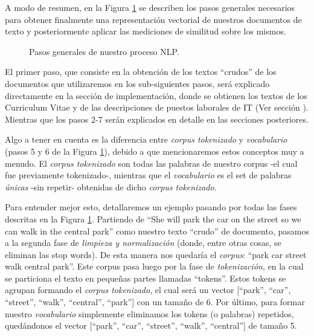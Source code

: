 \documentclass[12pt,a4paper]{article}
\begin{document}
\begin{sloppypar}
A modo de resumen, en la Figura \ref{fig:Imagen_NLP_1} se describen los pasos generales necesarios para obtener finalmente una representación vectorial de nuestros documentos de texto y posteriormente aplicar las mediciones de similitud sobre los mismos.

\begin{figure}[H]    %
 \centering
 \noindent{}
 \caption{Pasos generales de nuestro proceso NLP.}
 \label{fig:Imagen_NLP_1}
\end{figure}

\cleardoublepage

El primer paso, que consiste en la obtención de los textos “crudos” de los documentos que utilizaremos en los sub-siguientes pasos, será explicado directamente en la sección de implementación, donde se obtienen los textos de los Curriculum Vitae y de las descripciones de puestos laborales de IT (Ver sección \textit{}). Mientras que los pasos 2-7 serán explicados en detalle en las secciones posteriores. 

Algo a tener en cuenta es la diferencia entre \textit{corpus tokenizado} y \textit{vocabulario} (pasos 5 y 6 de la Figura \ref{fig:Imagen_NLP_1}), debido a que mencionaremos estos conceptos muy a menudo. El \textit{corpus tokenizado} son todas las palabras de nuestro corpus -el cual fue previamente tokenizado-, mientras que el \textit{vocabulario} es el set de palabras \textit{únicas} -sin repetir- obtenidas de dicho \textit{corpus tokenizado}.

Para entender mejor esto, detallaremos un ejemplo pasando por todas las fases descritas en la Figura  \ref{fig:Imagen_NLP_1}. Partiendo de “She will park the car on the street so we can walk in the central park” como nuestro texto “crudo” de documento, pasamos a la segunda fase de \textit{limpieza y normalización} (donde, entre otras cosas, se eliminan las stop words). De esta manera nos quedaría el \textit{corpus}: “park car street walk central park”. Este corpus pasa luego por la fase de \textit{tokenización}, en la cual se particiona el texto en pequeñas partes llamadas “tokens”. Estos tokens se agrupan formando el \textit{corpus tokenizado}, el cual será un vector [“park”, “car”, “street”, “walk”, “central”, “park”] con un tamaño de 6. Por último, para formar nuestro \textit{vocabulario} simplemente eliminamos los tokens (o palabras) repetidos, quedándonos el vector [“park”, “car”, “street”, “walk”, “central”] de tamaño 5. 
\\


\end{sloppypar}
\end{document}
